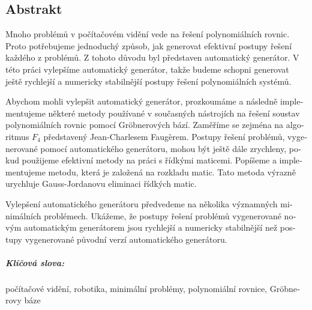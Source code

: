 \begin{otherlanguage}{czech}
\chapter*{Abstrakt}
Mnoho problémů v počítačovém vidění vede na řešení polynomiálních rovnic. Proto potřebujeme jednoduchý způsob, jak generovat efektivní postupy řešení každého z problémů. Z tohoto důvodu byl představen automatický generátor. V této práci vylepšíme automatický generátor, takže budeme schopni generovat ještě rychlejší a numericky stabilnější postupy řešení polynomiálních systémů.

Abychom mohli vylepšit automatický generátor, prozkoumáme a následně implementujeme některé metody používané v současných nástrojích na řešení soustav polynomiálních rovnic pomocí Gr\"obnerových bází. Zaměříme se zejména na algoritmus $F_4$ představený Jean-Charlesem Faug\`erem. Postupy řešení problémů, vygenerované pomocí automatického generátoru, mohou být ještě dále zrychleny, pokud použijeme efektivní metody na práci s řídkými maticemi. Popíšeme a implementujeme metodu, která je založená na rozkladu matic. Tato metoda výrazně urychluje Gauss-Jordanovu eliminaci řídkých matic.

Vylepšení automatického generátoru předvedeme na několika významných mini\-mál\-ních problémech. Ukážeme, že postupy řešení problémů vygenerované novým automatickým generátorem jsou rychlejší a numericky stabilnější než postupy vygenerované původní verzí automatického generátoru.

\paragraph{Klíčová slova:} počítačové vidění, robotika, minimální problémy, polynomiální rovnice, Gr\"obnerovy báze
\end{otherlanguage}
